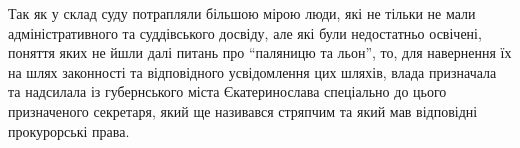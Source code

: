\documentclass[a4paper,20pt]{report}
\begin{document}
Так як у склад суду потрапляли більшою мірою люди, які не тільки не мали адміністративного та суддівського досвіду,
але які були недостатньо освічені, поняття яких не йшли далі питань про ``паляницю та льон'', то, для навернення
їх на шлях законності та відповідного усвідомлення цих шляхів, влада призначала та надсилала із губернського міста 
Єкатеринослава спеціально до цього призначеного секретаря, який ще називався стряпчим та який мав відповідні
прокурорські права.
\end{document}
